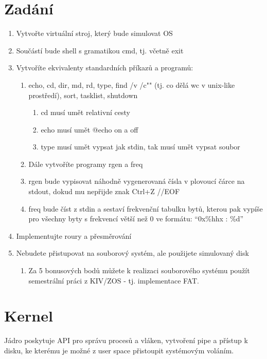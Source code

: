 \documentclass[11pt,a4paper]{scrartcl}
\begin{document}
	\section{Zadání}
	\begin{enumerate}
		\item 	Vytvořte virtuální stroj, který bude simulovat OS
		\item 	Součástí bude shell s gramatikou cmd, tj. včetně exit
		\item 	Vytvoříte ekvivalenty standardních příkazů a programů:
		\begin{enumerate}
			\item echo, cd, dir, md, rd, type, find /v /c"" (tj. co dělá wc v unix-like prostředí), sort, tasklist, shutdown
			
			\begin{enumerate}
				\item	cd musí umět relativní cesty
				\item	echo musí umět @echo on a off
				\item	type musí umět vypsat jak stdin, tak musí umět vypsat soubor
			\end{enumerate}
		
			\item	Dále vytvoříte programy rgen a freq
			\item	rgen bude vypisovat náhodně vygenerovaná čísla v plovoucí čárce na stdout, dokud mu nepřijde znak Ctrl+Z //EOF
			\item	freq bude číst z stdin a sestaví frekvenční tabulku bytů, kterou pak vypíše pro všechny byty s frekvencí větší než 0 ve formátu: “0x\%hhx : \%d”
		\end{enumerate}
		\item 	Implementujte roury a přesměrování
		\item 	Nebudete přistupovat na souborový systém, ale použijete simulovaný disk
		
		\begin{enumerate}
			\item 	Za 5 bonusových bodů můžete k realizaci souborového systému použít semestrální práci z KIV/ZOS - tj. implementace FAT.
		\end{enumerate}
	\end{enumerate}

	\section{Kernel}
	Jádro poskytuje API pro správu procesů a vláken, vytvoření pipe a přístup k disku, ke kterému je možné z user space přistoupit systémovým voláním.
	
\end{document}
